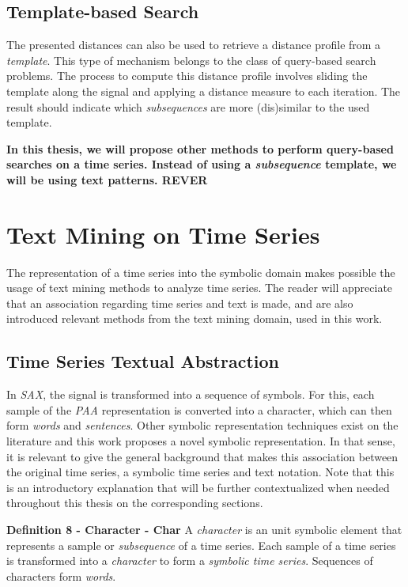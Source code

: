 \subsection{Template-based Search}
\label{sec:query_based_search}

The presented distances can also be used to retrieve a distance profile from a \textit{template}. This type of mechanism belongs to the class of query-based search problems. The process to compute this distance profile involves sliding the template along the signal and applying a distance measure to each iteration. The result should indicate which \textit{subsequences} are more (dis)similar to the used template.
\par


\textbf{In this thesis, we will propose other methods to perform query-based searches on a time series. Instead of using a \textit{subsequence} template, we will be using text patterns. REVER}

\section{Text Mining on Time Series}
\label{sec:text_time}

The representation of a time series into the symbolic domain makes possible the usage of text mining methods to analyze time series. The reader will appreciate that an association regarding time series and text is made, and are also introduced relevant methods from the text mining domain, used in this work.

\subsection{Time Series Textual Abstraction}
\label{subsec:text_abstraction}

In \textit{SAX}, the signal is transformed into a sequence of symbols. For this, each sample of the \textit{PAA} representation is converted into a character, which can then form \textit{words} and \textit{sentences}. Other symbolic representation techniques exist on the literature and this work proposes a novel symbolic representation. In that sense, it is relevant to give the general background that makes this association between the original time series, a symbolic time series and text notation. Note that this is an introductory explanation that will be further contextualized when needed throughout this thesis on the corresponding sections.

\item \textbf{Definition 8 - Character - Char} A \textit{character} is an unit symbolic element that represents a sample or \textit{subsequence} of a time series. Each sample of a time series is transformed into a \textit{character} to form a \textit{symbolic time series}. Sequences of characters form \textit{words}.

